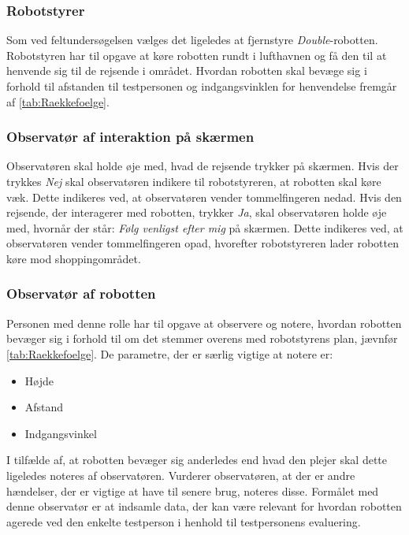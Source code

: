 \subsubsection*{Robotstyrer}
%
Som ved feltundersøgelsen vælges det ligeledes at fjernstyre \textit{Double}-robotten. Robotstyren har til opgave at køre robotten rundt i lufthavnen og få den til at henvende sig til de rejsende i området. Hvordan robotten skal bevæge sig i forhold til afstanden til testpersonen og indgangsvinklen for henvendelse fremgår af \autoref{tab:Raekkefoelge}.

\subsubsection*{Observatør af interaktion på skærmen}
%
Observatøren skal holde øje med, hvad de rejsende trykker på skærmen. Hvis der trykkes \textit{Nej} skal observatøren indikere til robotstyreren, at robotten skal køre væk. Dette indikeres ved, at observatøren vender tommelfingeren nedad. Hvis den rejsende, der interagerer med robotten, trykker \textit{Ja}, skal observatøren holde øje med, hvornår der står: \textit{Følg venligst efter mig} på skærmen. Dette indikeres ved, at observatøren vender tommelfingeren opad, hvorefter robotstyreren lader robotten køre mod shoppingområdet. 

\subsubsection*{Observatør af robotten}
%
Personen med denne rolle har til opgave at observere og notere, hvordan robotten bevæger sig i forhold til om det stemmer overens med robotstyrens plan, jævnfør \autoref{tab:Raekkefoelge}. De parametre, der er særlig vigtige at notere er:\blankline 
%
\begin{itemize}
	\item Højde
	\item Afstand
	\item Indgangsvinkel\blankline
\end{itemize}
\noindent
%
I tilfælde af, at robotten bevæger sig anderledes end hvad den plejer skal dette ligeledes noteres af observatøren. Vurderer observatøren, at der er andre hændelser, der er vigtige at have til senere brug, noteres disse. Formålet med denne observatør er at indsamle data, der kan være relevant for hvordan robotten agerede ved den enkelte testperson i henhold til testpersonens evaluering.

